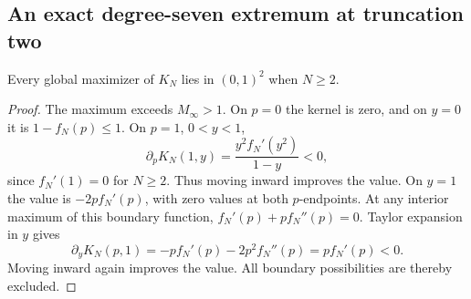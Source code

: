 \subsection{An exact degree-seven extremum at truncation two}
\begin{lemma}\label{ker:lem:interior}
Every global maximizer of $K_N$ lies in $(0,1)^2$ when $N\ge2$.
\end{lemma}
\begin{proof}
The maximum exceeds $M_\infty>1$. On $p=0$ the kernel is zero,
and on $y=0$ it is $1-f_N(p)\le1$. On $p=1$, $0<y<1$,
\[
 \partial_pK_N(1,y)=\frac{y^2f_N'(y^2)}{1-y}<0,
\]
since $f_N'(1)=0$ for $N\ge2$. Thus moving inward improves the value.
On $y=1$ the value is $-2pf_N'(p)$, with zero values at both
$p$-endpoints. At any interior maximum of this boundary function,
$f_N'(p)+pf_N''(p)=0$. Taylor expansion in $y$ gives
\[
 \partial_yK_N(p,1)=-pf_N'(p)-2p^2f_N''(p)=pf_N'(p)<0.
\]
Moving inward again improves the value. All boundary possibilities
are thereby excluded.
\end{proof}

